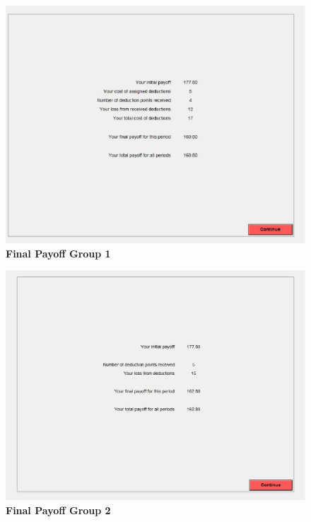 \documentclass[12pt]{article}
\begin{document}
\centering
\begin{figure}[H]
\includegraphics[width=40pc]{fpg1}
\caption*{\bf Final Payoff Group 1}
\end{figure}

\newpage

\centering
\begin{figure}[H]
\includegraphics[width=40pc]{fpg2}
\caption*{\bf Final Payoff Group 2}
\end{figure}

\newpage







\end{document}
